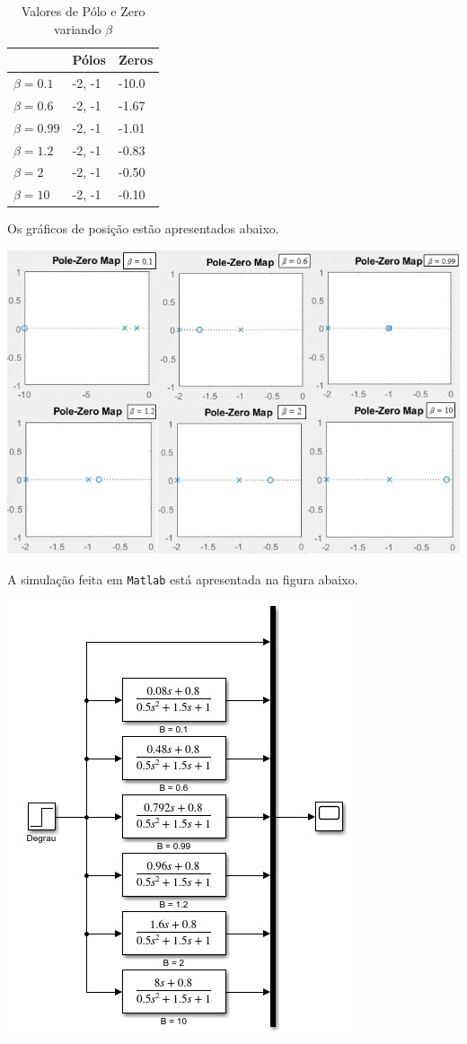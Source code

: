 \documentclass[
]{book}
\theoremstyle{definition}
\theoremstyle{definition}
\theoremstyle{definition}
\theoremstyle{remark}
\begin{document}
\begin{table}

\caption{\label{tab:unnamed-chunk-6}Valores de Pólo e Zero variando $\beta$}
\centering
\begin{tabular}[t]{lll}
\toprule
  & Pólos & Zeros\\
\midrule
$\beta = 0.1$ & {-2, -1} & -10.0\\
$\beta = 0.6$ & {-2, -1} & -1.67\\
$\beta = 0.99$ & {-2, -1} & -1.01\\
$\beta = 1.2$ & {-2, -1} & -0.83\\
$\beta = 2$ & {-2, -1} & -0.50\\
\addlinespace
$\beta = 10$ & {-2, -1} & -0.10\\
\bottomrule
\end{tabular}
\end{table}

Os gráficos de posição estão apresentados abaixo.

\includegraphics{Imagens/Lab2/prob4Varios.jpg}

A simulação feita em \texttt{Matlab} está apresentada na figura abaixo.

\includegraphics{Imagens/Lab2/modelSim4.jpg}
\end{document}
